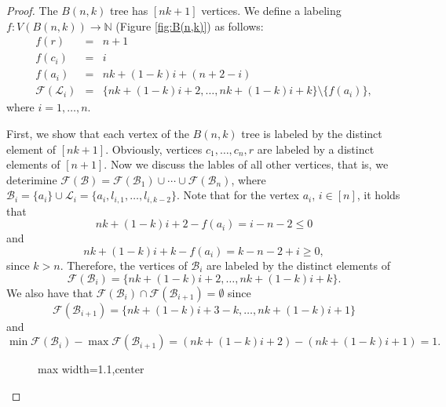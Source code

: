 \documentclass[10pt]{article}
\theoremstyle{definition}
\begin{document}
\begin{proof}
  The $B(n,k)$ tree has $[nk + 1]$ vertices. We define a labeling $f: V(B(n, k)) \rightarrow \mathbb{N}$
  (Figure \ref{fig:B(n,k)}) as follows:
  $$
  \begin{array}{lcl}
    f(r) & = & n + 1 \\
    f(c_i) & = & i \\
    f(a_i) & = & nk + (1-k)i + (n+2-i) \\
    \mathcal{F}(\mathcal{L}_i) & = & \{ nk + (1-k)i + 2, \ldots , nk + (1 - k)i + k\} \setminus \{f(a_i)\},
  \end{array}
  $$
  where $i = 1, \ldots, n$.

  First, we show that each vertex of the $B(n, k)$ tree is labeled by the distinct element of $[nk + 1]$.
  Obviously, vertices $c_1, \ldots, c_n, r$ are labeled by a distinct elements of $[n + 1]$. Now we discuss the lables of all other vertices, that is, we deterimine  $\mathcal{F}(\mathcal{B}) =  \mathcal{F}(\mathcal{B}_1) \cup \cdots \cup \mathcal{F}(\mathcal{B}_n)$, where $\mathcal{B}_i = \{a_i\} \cup \mathcal{L}_i = \{a_i,  l_{i,1}, \ldots, l_{i, k-2}\}$.
  Note that for the vertex $a_i$, $i \in [n]$, it holds that
  $$
  nk + (1-k)i + 2 - f(a_i)  = i-n-2 \le 0
  $$
  and
  $$
  nk + (1 - k)i + k - f(a_i) = k - n -2 + i \ge 0,
  $$
  since $k > n $. Therefore, the vertices of $\mathcal{B}_i$ are labeled by the distinct elements of
  $$
  \mathcal{F}(\mathcal{B}_i) = \{ nk + (1-k)i + 2, \dots, nk + (1-k)i + k\}.
  $$
  We also have that $\mathcal{F}(\mathcal{B}_i) \cap \mathcal{F}(\mathcal{B}_{i + 1}) = \emptyset$ since
  \begin{equation}\label{lab_bi}
    \mathcal{F}(\mathcal{B}_{i + 1}) = \{nk + (1-k)i +3 - k, \dots, nk + (1-k)i +1\}
  \end{equation}
  and
  $$
  \min{\mathcal{F}(\mathcal{B}_{i})} - \max{\mathcal{F}(\mathcal{B}_{i + 1})} = (nk + (1-k)i + 2) - ( nk + (1-k)i +1) = 1.
  $$

  \begin{figure}[H]
    \centering
    \begin{adjustbox}{max width=1.1\textwidth,center}
\end{adjustbox}
\end{figure}
\end{proof}
\end{document}
